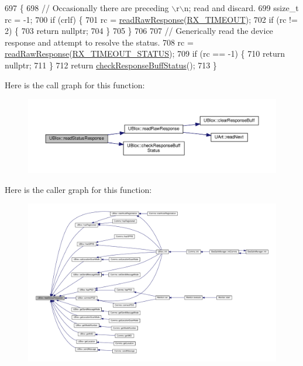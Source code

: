 \begin{DoxyCode}
697 \{
698     \textcolor{comment}{// Occasionally there are preceding \(\backslash\)r\(\backslash\)n; read and discard.}
699     ssize\_t rc = -1;
700     \textcolor{keywordflow}{if} (crlf) \{
701         rc = \hyperlink{class_u_blox_ab4a7ab4b8922d91e23f273ae160c1bed}{readRawResponse}(\hyperlink{_u_blox_8cpp_ab6426fc74901f4fbec94862ebb672b81}{RX\_TIMEOUT});
702         \textcolor{keywordflow}{if} (rc != 2) \{
703             \textcolor{keywordflow}{return} \textcolor{keyword}{nullptr};
704         \}
705     \}
706 
707     \textcolor{comment}{// Generically read the device response and attempt to resolve the status.}
708     rc = \hyperlink{class_u_blox_ab4a7ab4b8922d91e23f273ae160c1bed}{readRawResponse}(\hyperlink{_u_blox_8cpp_afed44347eb1fde151258e73004078c98}{RX\_TIMEOUT\_STATUS});
709     \textcolor{keywordflow}{if} (rc == -1) \{
710         \textcolor{keywordflow}{return} \textcolor{keyword}{nullptr};
711     \}
712     \textcolor{keywordflow}{return} \hyperlink{class_u_blox_aab6ad68e4c7522278f19ceab1dc2a58d}{checkResponseBuffStatus}();
713 \}
\end{DoxyCode}
Here is the call graph for this function\+:\nopagebreak
\begin{figure}[H]
\begin{center}
\leavevmode
\includegraphics[width=350pt]{da/df6/class_u_blox_a4eaca5b1b1c4b5b6f6164b220dd43e0b_cgraph}
\end{center}
\end{figure}
Here is the caller graph for this function\+:\nopagebreak
\begin{figure}[H]
\begin{center}
\leavevmode
\includegraphics[width=350pt]{da/df6/class_u_blox_a4eaca5b1b1c4b5b6f6164b220dd43e0b_icgraph}
\end{center}
\end{figure}
\mbox{\label{class_u_blox_a23c4bd15586b776045beaaa840c637f4}} 
